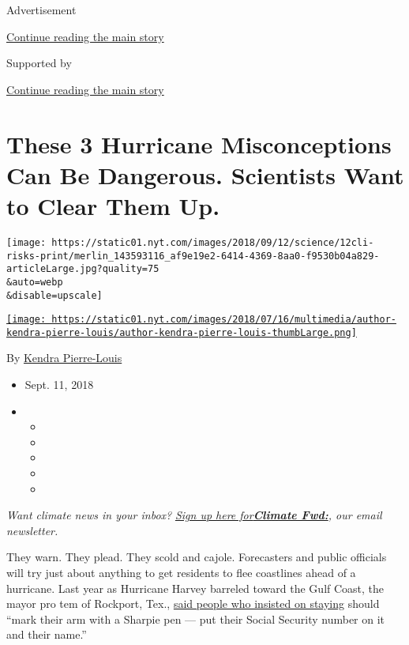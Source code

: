 Advertisement

\protect\hyperlink{after-top}{Continue reading the main story}

Supported by

\protect\hyperlink{after-sponsor}{Continue reading the main story}

\hypertarget{these-3-hurricane-misconceptions-can-be-dangerous-scientists-want-to-clear-them-up}{%
\section{These 3 Hurricane Misconceptions Can Be Dangerous. Scientists
Want to Clear Them
Up.}\label{these-3-hurricane-misconceptions-can-be-dangerous-scientists-want-to-clear-them-up}}

\texttt{[image: https://static01.nyt.com/images/2018/09/12/science/12cli-risks-print/merlin\_143593116\_af9e19e2-6414-4369-8aa0-f9530b04a829-articleLarge.jpg?quality=75\\\&auto=webp\\\&disable=upscale]}

\href{https://www.nytimes.com/by/kendra-pierre-louis}{\texttt{[image: https://static01.nyt.com/images/2018/07/16/multimedia/author-kendra-pierre-louis/author-kendra-pierre-louis-thumbLarge.png]}}

By \href{https://www.nytimes.com/by/kendra-pierre-louis}{Kendra
Pierre-Louis}

\begin{itemize}
\item
  Sept. 11, 2018
\item
  \begin{itemize}
  \item
  \item
  \item
  \item
  \item
  \end{itemize}
\end{itemize}

\emph{Want climate news in your inbox?}
\href{https://www.nytimes.com/newsletters/climate-change}{\emph{Sign up
here
for}}\textbf{\href{https://www.nytimes.com/newsletters/climate-change}{\emph{Climate
Fwd:}}}\emph{, our email newsletter.}

They warn. They plead. They scold and cajole. Forecasters and public
officials will try just about anything to get residents to flee
coastlines ahead of a hurricane. Last year as Hurricane Harvey barreled
toward the Gulf Coast, the mayor pro tem of Rockport, Tex.,
\href{https://www.kiiitv.com/article/weather/rockport-mayor-pro-tem-those-who-dont-evacuate-should-mark-social-security-number-on-their-arm/467431326}{said
people who insisted on staying} should ``mark their arm with a Sharpie
pen --- put their Social Security number on it and their name.''

